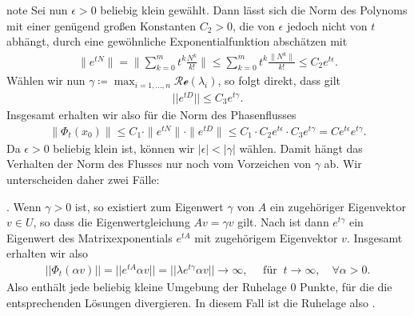 \documentclass[letterpaper,10pt,english]{jupyterBook}
\begin{document}
\begin{sphinxadmonition}{note}
\sphinxAtStartPar
Sei nun \(\epsilon > 0\) beliebig klein gewählt.
Dann lässt sich die Norm des Polynoms mit einer genügend großen Konstanten \(C_2 > 0\), die von \(\epsilon\) jedoch nicht von \(t\) abhängt, durch eine gewöhnliche Exponentialfunktion abschätzen mit
\begin{equation*}
\begin{split} \|e^{tN}\| = \| \sum_{k=0}^m t^k\frac{N^k}{k!} \| \leq \sum_{k=0}^m t^k \frac{\|N^k\|}{k!} \leq C_2  e^{t \epsilon}.\end{split}
\end{equation*}
\sphinxAtStartPar
Wählen wir nun \(\gamma \coloneqq \max_{i=1,\dots,n} \mathcal{Re}(\lambda_i)\), so folgt direkt, dass gilt
\begin{equation*}
\begin{split}||e^{tD}|| \leq C_3 e^{t\gamma}.\end{split}
\end{equation*}
\sphinxAtStartPar
Insgesamt erhalten wir also für die Norm des Phasenflusses
\begin{equation}\label{equation:odestability/ruhelagen:eq:abschaetzungew}
\begin{split}\|\Phi_t(x_0)\| \leq C_1 \cdot \|e^{tN}\| \cdot \|e^{tD}\| \leq C_1 \cdot C_2 e^{t \epsilon} \cdot C_3 e^{t\gamma} = C e^{t \epsilon} e^{t\gamma}.\end{split}
\end{equation}
\sphinxAtStartPar
Da \(\epsilon > 0\) beliebig klein ist, können wir \(|\epsilon| < |\gamma|\) wählen.
Damit hängt das Verhalten der Norm des Flusses nur noch vom Vorzeichen von \(\gamma\) ab.
Wir unterscheiden daher zwei Fälle:

. Wenn \(\gamma >0\) ist, so existiert zum Eigenwert \(\gamma\) von \(A\) ein zugehöriger Eigenvektor \(v\in U\), so dass die Eigenwertgleichung \(A v = \gamma v\) gilt.
Nach {\hyperref[\detokenize{ode/repetition:lem:mpotew}]{}} ist dann \(e^{t\gamma}\) ein Eigenwert des Matrixexponentials \(e^{tA}\) mit zugehörigem Eigenvektor \(v\).
Insgesamt erhalten wir also
\begin{equation*}
\begin{split}||\Phi_t(\alpha v)|| = ||e^{tA}\alpha v|| = ||\lambda e^{t\gamma} \alpha v|| \to \infty, \quad \text{ für } \ t \to \infty, \quad  \forall \alpha>0. \end{split}
\end{equation*}
\sphinxAtStartPar
Also enthält jede beliebig kleine Umgebung der Ruhelage \(0\) Punkte, für die die entsprechenden Lösungen divergieren.
In diesem Fall ist die Ruhelage also .


\end{sphinxadmonition}
\end{document}
